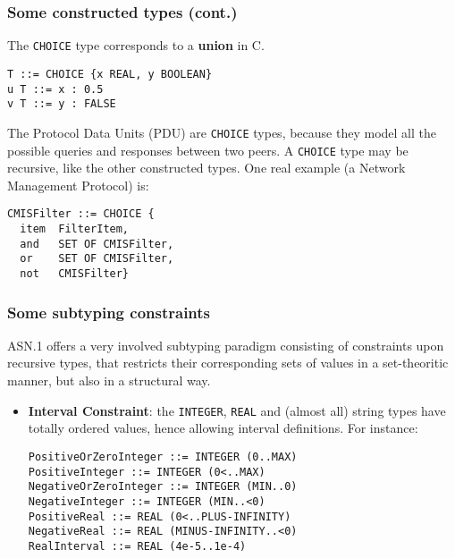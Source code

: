 \documentclass[compress,dvips,xcolor={dvipsnames},t]{beamer}
\newcommand\ASN{\textsf{ASN.1}\xspace}
\begin{document}
\begin{frame}[containsverbatim]
\frametitle{Some constructed types (cont.)}

The \texttt{CHOICE} type corresponds to a \textbf{union} in C.
\begin{verbatim}
T ::= CHOICE {x REAL, y BOOLEAN}
u T ::= x : 0.5
v T ::= y : FALSE
\end{verbatim}
The Protocol Data Units (PDU) are \texttt{CHOICE} types, because they
model all the possible queries and responses between two peers. A
\texttt{CHOICE} type may be recursive, like the other constructed
types. One real example (a Network Management Protocol) is:
\begin{verbatim}
CMISFilter ::= CHOICE {
  item  FilterItem,
  and   SET OF CMISFilter,
  or    SET OF CMISFilter,
  not   CMISFilter}
\end{verbatim}

\end{frame}

\begin{frame}[containsverbatim]
\frametitle{Some subtyping constraints}

\ASN offers a very involved subtyping paradigm consisting of
constraints upon recursive types, that restricts their corresponding
sets of values in a set-theoritic manner, but also in a structural
way.
\begin{itemize}

  \item \textbf{Interval Constraint}: the \texttt{INTEGER},
  \texttt{REAL} and (almost all) string types have totally ordered
  values, hence allowing interval definitions. For instance:

\begin{verbatim}
PositiveOrZeroInteger ::= INTEGER (0..MAX)
PositiveInteger ::= INTEGER (0<..MAX)
NegativeOrZeroInteger ::= INTEGER (MIN..0)
NegativeInteger ::= INTEGER (MIN..<0)
PositiveReal ::= REAL (0<..PLUS-INFINITY)
NegativeReal ::= REAL (MINUS-INFINITY..<0)
RealInterval ::= REAL (4e-5..1e-4)
\end{verbatim}
\end{itemize}

\end{frame}
\end{document}
